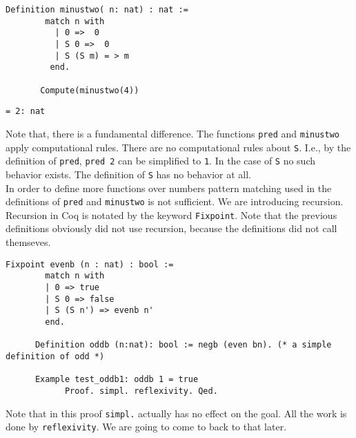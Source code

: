 	  \begin{minipage}[t]{0.50\textwidth}
	  \begin{lstlisting}[caption= \lstinline! minustwo!]
	   Definition minustwo( n: nat) : nat :=
	    match n with
	      | 0 =>  0
	      | S 0 =>  0
	      | S (S m) = > m
	     end.
	     
	   Compute(minustwo(4))
	   \end{lstlisting} 
	   \end{minipage} 
	   \hfill     
	  \begin{minipage}[t]{0.45\textwidth}
	  \begin{lstlisting}[caption = Coq-output] 
	    = 2: nat 
	   \end{lstlisting}
	   \end{minipage}     
	      
	     
	  Note that, there is a fundamental difference.
	  The functions \lstinline!pred! and \lstinline!minustwo! apply computational rules. 
	  There are no computational rules about \lstinline!S!.
	  I.e., by the definition of \lstinline!pred!, \lstinline!pred 2! can be simplified to \lstinline!1!. 
	  In the case of \lstinline!S! no such behavior exists.
	  The definition of \lstinline!S! has no behavior at all.\\     
	  
	  In order to define more functions over numbers pattern matching used in the definitions of \lstinline!pred! and \lstinline!minustwo! is not sufficient. We are introducing recursion.
	  Recursion in Coq is notated by the keyword \lstinline!Fixpoint!. Note that the previous definitions obviously did not use recursion, because the definitions did not call themseves.
	  
	  \begin{lstlisting}[caption = \lstinline!evenb! and \lstinline!oddb!]
	  Fixpoint evenb (n : nat) : bool :=
	  	match n with
	  	| 0 => true
	  	| S 0 => false
	  	| S (S n') => evenb n'
	  	end.
	  	
	  Definition oddb (n:nat): bool := negb (even bn). (* a simple definition of odd *)
	  	
	  Example test_oddb1: oddb 1 = true
	    	Proof. simpl. reflexivity. Qed.
	  \end{lstlisting}
	   Note that in this proof \lstinline!simpl.! actually has no effect on the goal. 
	   All the work is done by \lstinline!reflexivity!. 
	   We are going to come to back to that later.

